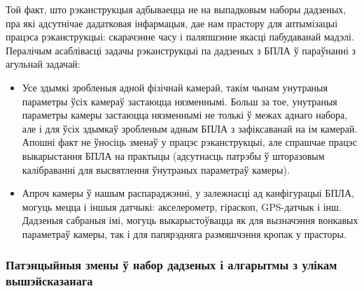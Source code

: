 Той факт, што рэканструкцыя адбываецца не на выпадковым наборы дадзеных, пра які адсутнічае дадатковая інфармацыя,
дае нам прастору для аптымізацыі працэса рэканструкцыі: скарачэнне часу і паляпшэнне якасці пабудаванай мадэлі.
Пералічым асаблівасці задачы рэканструкцыі па дадзеных з БПЛА ў параўнанні з агульнай задачай:
\begin{itemize}
    \item Усе здымкі зробленыя адной фізічнай камерай, такім чынам унутраныя параметры ўсіх камераў застаюцца нязменнымі.
    Больш за тое, унутраныя параметры камеры застаюцца нязменнымі не толькі ў межах аднаго набора,
    але і для ўсіх здымкаў зробленым адным БПЛА з зафіксаванай на ім камерай.
    Апошні факт не ўносіць зменаў у працэс рэканструкцыі, але спрашчае працэс выкарыстання БПЛА на практыцы
    (адсутнасць патрэбы ў шторазовым калібраванні для высвятлення ўнутраных параметраў камеры).
    \item Апроч камеры ў нашым распараджэнні, у залежнасці ад канфігурацыі БПЛА, могуць мецца і іншыя датчыкі:
    акселерометр, гіраскоп, GPS-датчык і інш.
    Дадзеныя сабраныя імі, могуць выкарыстоўвацца як для вызначэння вонкавых параметраў камеры,
    так і для папярэдняга размяшчэння кропак у прасторы.
\end{itemize}

\subsubsection*{Патэнцыйныя змены ў набор дадзеных і алгарытмы з улікам вышэйсказанага}

